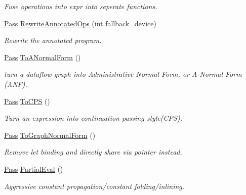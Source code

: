 \begin{DoxyCompactItemize}
\begin{DoxyCompactList}\small\item\em Fuse operations into expr into seperate functions. \end{DoxyCompactList}\item 
\hyperlink{namespacetvm_1_1relay_1_1transform_afa666ade112e9955059095d695238a9a}{Pass} \hyperlink{namespacetvm_1_1relay_1_1transform_a03b053f3d99d5c420ddc8492e6b987bf}{Rewrite\+Annotated\+Ops} (int fallback\+\_\+device)
\begin{DoxyCompactList}\small\item\em Rewrite the annotated program. \end{DoxyCompactList}\item 
\hyperlink{namespacetvm_1_1relay_1_1transform_afa666ade112e9955059095d695238a9a}{Pass} \hyperlink{namespacetvm_1_1relay_1_1transform_a8cb03cf00b2ddf25f183ab837cde713c}{To\+A\+Normal\+Form} ()
\begin{DoxyCompactList}\small\item\em turn a dataflow graph into Administrative Normal Form, or A-\/\+Normal Form (A\+NF). \end{DoxyCompactList}\item 
\hyperlink{namespacetvm_1_1relay_1_1transform_afa666ade112e9955059095d695238a9a}{Pass} \hyperlink{namespacetvm_1_1relay_1_1transform_ad90e4d6ac08b62ef553755e759d398fa}{To\+C\+PS} ()
\begin{DoxyCompactList}\small\item\em Turn an expression into continuation passing style(\+C\+P\+S). \end{DoxyCompactList}\item 
\hyperlink{namespacetvm_1_1relay_1_1transform_afa666ade112e9955059095d695238a9a}{Pass} \hyperlink{namespacetvm_1_1relay_1_1transform_a2cfef0e02cca22f3e0e85e0a10a82f5b}{To\+Graph\+Normal\+Form} ()
\begin{DoxyCompactList}\small\item\em Remove let binding and directly share via pointer instead. \end{DoxyCompactList}\item 
\hyperlink{namespacetvm_1_1relay_1_1transform_afa666ade112e9955059095d695238a9a}{Pass} \hyperlink{namespacetvm_1_1relay_1_1transform_aa270d98da5518969e005c7e30d6eb6fe}{Partial\+Eval} ()
\begin{DoxyCompactList}\small\item\em Aggressive constant propagation/constant folding/inlining. \end{DoxyCompactList}\item 

\end{DoxyCompactItemize}
